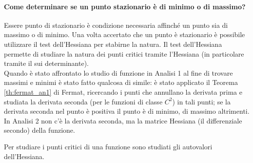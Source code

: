 \begin{example}
\begin{figure}[ht]
		\caption{}
		\label{fig:regione-circolare-sezioni}
	\end{figure}
\end{example}

\paragraph{Come determinare se un punto stazionario è di minimo o di massimo?} Essere punto di stazionario è condizione necessaria affinché un punto sia di massimo o di minimo. Una volta accertato che un punto è stazionario è possibile utilizzare il test dell'Hessiana per stabirne la natura. Il test dell'Hessiana permette di studiare la natura dei punti critici tramite l'Hessiana (in particolare tramite il sui determinante).\\
Quando è stato affrontato lo studio di funzione in Analisi 1 al fine di trovare massimi e minimi è stato fatto qualcosa di simile: è stato applicato il Teorema \ref{th:fermat_an1} di Fermat, ricercando i punti che annullano la derivata prima e studiata la derivata seconda (per le funzioni di classe $C^2$) in tali punti; se la derivata seconda nel punto è positiva il punto è di minimo, di massimo altrimenti. In Analisi 2 non c'è la derivata seconda, ma la matrice Hessiana (il differenziale secondo) della funzione. 

Per studiare i punti critici di una funzione sono studiati gli autovalori dell'Hessiana.


